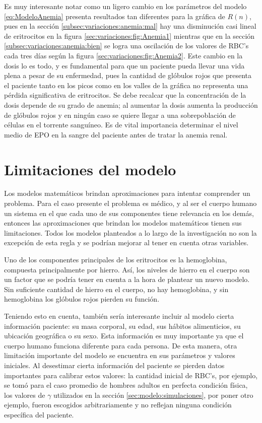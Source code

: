 Es muy interesante notar como un ligero cambio en los parámetros del modelo \ref{eq:ModeloAnemia} presenta resultados tan diferentes para la gráfica de $R(n)$, pues en la sección \ref{subsec:variaciones:anemia:mal} hay una disminución casi lineal de eritrocitos en la figura \ref{sec:variaciones:fig:Anemia1} mientras que en la sección \ref{subsec:variaciones:anemia:bien} se logra una oscilación de los valores de RBC's cada tres días según la figura \ref{sec:variaciones:fig:Anemia2}. Este cambio en la dosis lo es todo, y es fundamental para que un paciente pueda llevar una vida plena a pesar de su enfermedad, pues la cantidad de glóbulos rojos que presenta el paciente tanto en los picos como en los valles de la gráfica no representa una pérdida significativa de eritrocitos. Se debe recalcar que la concentración de la dosis depende de su grado de anemia; al aumentar la dosis aumenta la producción de glóbulos rojos y en ningún caso se quiere llegar a una sobrepoblación de células en el torrente sanguíneo. Es de vital importancia determinar el nivel medio de EPO en la sangre del paciente antes de tratar la anemia renal.

\section{Limitaciones del modelo}

Los modelos matemáticos brindan aproximaciones para intentar comprender un problema. Para el caso presente el problema es médico, y al ser el cuerpo humano un sistema en el que cada uno de sus componentes tiene relevancia en los demás, entonces las aproximaciones que brindan los modelos matemáticos tienen sus limitaciones. Todos los modelos planteados a lo largo de la investigación no son la excepción de esta regla y se podrían mejorar al tener en cuenta otras variables.

Uno de los componentes principales de los eritrocitos es la hemoglobina, compuesta principalmente por hierro. Así, los niveles de hierro en el cuerpo son un factor que se podría tener en cuenta a la hora de plantear un nuevo modelo. Sin suficiente cantidad de hierro en el cuerpo, no hay hemoglobina, y sin hemoglobina los glóbulos rojos pierden su función.

Teniendo esto en cuenta, también sería interesante incluir al modelo cierta información paciente: su masa corporal, su edad, sus hábitos alimenticios, su ubicación geográfica o su sexo. Esta información es muy importante ya que el cuerpo humano funciona diferente para cada persona. De esta manera, otra limitación importante del modelo se encuentra en sus parámetros y valores iniciales. Al desestimar cierta información del paciente se pierden datos importantes para calibrar estos valores: la cantidad inicial de RBC's, por ejemplo, se tomó para el caso promedio de hombres adultos en perfecta condición física, los valores de $\gamma$ utilizados en la sección \ref{sec:modelo:simulaciones}, por poner otro ejemplo, fueron escogidos arbitrariamente y no reflejan ninguna condición específica del paciente. 

